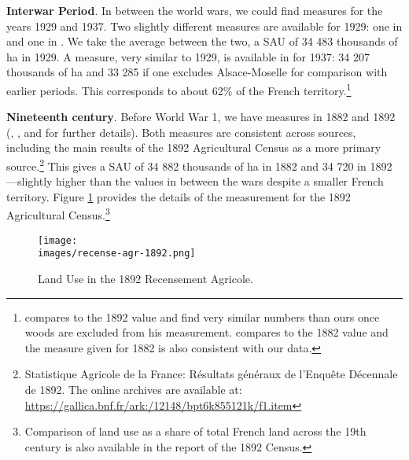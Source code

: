 \documentclass[11pt]{report}
\newcommand{\images}{../data/images}
\begin{document}
\noindent \textbf{Interwar Period}. In between the world wars, we could find measures for the years 1929 and 1937. Two slightly different measures are available for 1929: one in \cite{toutain1993production} and one in \cite{mauco1937modes}. We take the average between the two, a SAU of 34 483 thousands of ha in 1929.  A measure, very similar to 1929, is available in \cite{auge1945statistiques} for 1937: 34 207 thousands of ha and 33 285 if one excludes Alsace-Moselle for comparison with earlier periods. This corresponds to about 62\% of the French territory.\footnote{\cite{mauco1937modes} compares to the 1892 value and find very similar numbers than ours once woods are excluded from his measurement. \cite{auge1945statistiques} compares to the 1882 value and the measure given for 1882 is also consistent with our data.}

\noindent \textbf{Nineteenth century}. Before World War 1, we have measures in 1882 and 1892 (\cite{mauguin1890statistique}, \cite{flechey1898statistique}, \cite{hitier1899statistique} and \cite{toutain1993production} for further details). Both measures are consistent across sources, including the main results of the 1892 Agricultural Census as a more primary source.\footnote{Statistique Agricole de la France: Résultats généraux de l'Enquête Décennale de 1892. The online archives are available at:  \url{https://gallica.bnf.fr/ark:/12148/bpt6k855121k/f1.item}} This gives a SAU of 34 882 thousands of ha in 1882 and 34 720 in 1892---slightly higher than the values in between the wars despite a smaller French territory. Figure \ref{A-fig:recensement} provides the details of the measurement for the 1892 Agricultural Census.\footnote{Comparison of land use as a share of total French land across the 19th century is also available in the report of the 1892 Census.}

\begin{figure}
	\begin{center}
		\texttt{[image: \\images/recense-agr-1892.png]}
	\end{center}\caption{Land Use in the 1892 Recensement Agricole.\label{A-fig:recensement}}
\end{figure}
\end{document}
